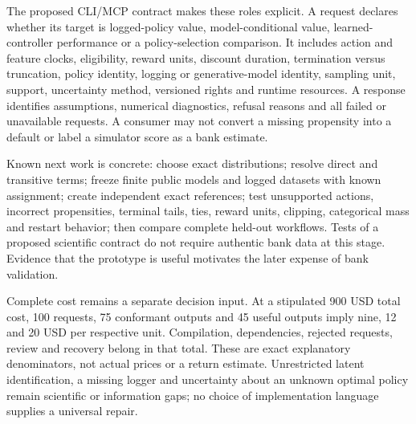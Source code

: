 The proposed CLI/MCP contract makes these roles explicit. A request declares whether its target is logged-policy value, model-conditional value, learned-controller performance or a policy-selection comparison. It includes action and feature clocks, eligibility, reward units, discount duration, termination versus truncation, policy identity, logging or generative-model identity, sampling unit, support, uncertainty method, versioned rights and runtime resources. A response identifies assumptions, numerical diagnostics, refusal reasons and all failed or unavailable requests. A consumer may not convert a missing propensity into a default or label a simulator score as a bank estimate.~\citep{exec24_policycxx_comparison}

Known next work is concrete: choose exact distributions; resolve direct and transitive terms; freeze finite public models and logged datasets with known assignment; create independent exact references; test unsupported actions, incorrect propensities, terminal tails, ties, reward units, clipping, categorical mass and restart behavior; then compare complete held-out workflows. Tests of a proposed scientific contract do not require authentic bank data at this stage. Evidence that the prototype is useful motivates the later expense of bank validation.~\citep{exec24_policycxx_comparison}

Complete cost remains a separate decision input. At a stipulated 900 USD total cost, 100 requests, 75 conformant outputs and 45 useful outputs imply nine, 12 and 20 USD per respective unit. Compilation, dependencies, rejected requests, review and recovery belong in that total. These are exact explanatory denominators, not actual prices or a return estimate. Unrestricted latent identification, a missing logger and uncertainty about an unknown optimal policy remain scientific or information gaps; no choice of implementation language supplies a universal repair.~\citep{exec24_policycxx_comparison}
